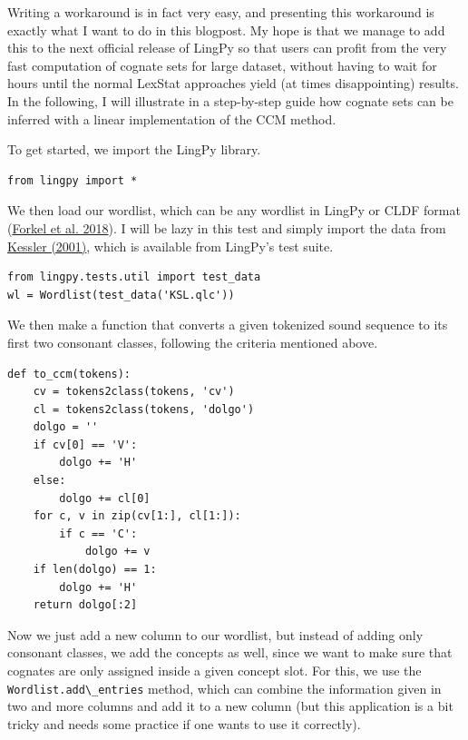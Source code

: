 \documentclass[
  english,
  a4paper,
  oneside,tablecaptionabove
]{scrbook}
\newcommand{\passthrough}[1]{#1}
\begin{document}
Writing a workaround is in fact very easy, and presenting this
workaround is exactly what I want to do in this blogpost. My hope is
that we manage to add this to the next official release of LingPy so
that users can profit from the very fast computation of cognate sets for
large dataset, without having to wait for hours until the normal LexStat
approaches yield (at times disappointing) results. In the following, I
will illustrate in a step-by-step guide how cognate sets can be inferred
with a linear implementation of the CCM method.

To get started, we import the LingPy library.

\begin{lstlisting}
from lingpy import *
\end{lstlisting}

We then load our wordlist, which can be any wordlist in LingPy or CLDF
format (\href{http://bibliography.lingpy.org?key=Forkel2018a}{Forkel et
al. 2018}). I will be lazy in this test and simply import the data from
\href{http://bibliography.lingpy.org?key=Kessler2001}{Kessler (2001)},
which is available from LingPy's test suite.

\begin{lstlisting}
from lingpy.tests.util import test_data
wl = Wordlist(test_data('KSL.qlc'))
\end{lstlisting}

We then make a function that converts a given tokenized sound sequence
to its first two consonant classes, following the criteria mentioned
above.

\begin{lstlisting}
def to_ccm(tokens):
    cv = tokens2class(tokens, 'cv')
    cl = tokens2class(tokens, 'dolgo')
    dolgo = ''
    if cv[0] == 'V': 
        dolgo += 'H'
    else:
        dolgo += cl[0]
    for c, v in zip(cv[1:], cl[1:]):
        if c == 'C':
            dolgo += v
    if len(dolgo) == 1:
        dolgo += 'H'
    return dolgo[:2]
\end{lstlisting}

Now we just add a new column to our wordlist, but instead of adding only
consonant classes, we add the concepts as well, since we want to make
sure that cognates are only assigned inside a given concept slot. For
this, we use the \passthrough{\lstinline!Wordlist.add\_entries!} method,
which can combine the information given in two and more columns and add
it to a new column (but this application is a bit tricky and needs some
practice if one wants to use it correctly).
\end{document}
